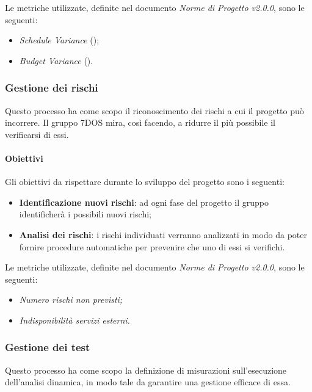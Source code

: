 Le metriche utilizzate, definite nel documento \emph{Norme di Progetto v2.0.0}, sono le seguenti:
\begin{itemize}
			\item{\emph{Schedule Variance} ();}
			\item{\emph{Budget Variance} ().}
\end{itemize}

\subsubsection{Gestione dei rischi}
Questo processo ha come scopo il riconoscimento dei rischi a cui il progetto può incorrere. Il gruppo 7DOS mira, così facendo, a ridurre il più possibile il verificarsi di essi.
\paragraph{Obiettivi} \Spazio
Gli obiettivi da rispettare durante lo sviluppo del progetto sono i seguenti:
\begin{itemize}
	\item{\textbf{Identificazione nuovi rischi}: ad ogni fase del progetto il gruppo identificherà i possibili nuovi rischi;}
	\item{\textbf{Analisi dei rischi}: i rischi individuati verranno analizzati in modo da poter fornire procedure automatiche per prevenire che uno di essi si verifichi.}
\end{itemize}
Le metriche utilizzate, definite nel documento \emph{Norme di Progetto v2.0.0}, sono le seguenti:
\begin{itemize}
	\item\emph{Numero rischi non previsti;}
	\item\emph{Indisponibilità servizi esterni.}
\end{itemize}

\subsubsection{Gestione dei test}
Questo processo ha come scopo la definizione di misurazioni sull'esecuzione dell'analisi dinamica, in modo tale da garantire una gestione efficace di essa.
